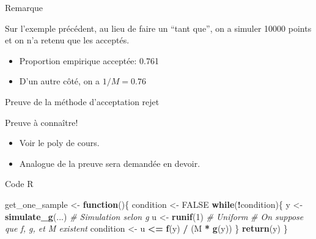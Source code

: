 \documentclass[ignorenonframetext,]{beamer}
\newenvironment{Shaded}{\begin{snugshade}}{\end{snugshade}}
\newcommand{\CommentTok}[1]{\textcolor[rgb]{0.56,0.35,0.01}{\textit{#1}}}
\newcommand{\ControlFlowTok}[1]{\textcolor[rgb]{0.13,0.29,0.53}{\textbf{#1}}}
\newcommand{\DecValTok}[1]{\textcolor[rgb]{0.00,0.00,0.81}{#1}}
\newcommand{\KeywordTok}[1]{\textcolor[rgb]{0.13,0.29,0.53}{\textbf{#1}}}
\newcommand{\NormalTok}[1]{#1}
\newcommand{\OperatorTok}[1]{\textcolor[rgb]{0.81,0.36,0.00}{\textbf{#1}}}
\newcommand{\OtherTok}[1]{\textcolor[rgb]{0.56,0.35,0.01}{#1}}
\newcommand{\StringTok}[1]{\textcolor[rgb]{0.31,0.60,0.02}{#1}}
\providecommand{\tightlist}{%
  \setlength{\itemsep}{0pt}\setlength{\parskip}{0pt}}
\begin{document}
\begin{frame}{Remarque}
\protect\hypertarget{remarque}{}

Sur l'exemple précédent, au lieu de faire un ``tant que'', on a simuler
10000 points et on n'a retenu que les acceptés. \pause

\begin{itemize}
\tightlist
\item
  Proportion empirique acceptée: 0.761
\item
  D'un autre côté, on a \(1/M = 0.76\)
\end{itemize}

\end{frame}

\begin{frame}{Preuve de la méthode d'acceptation rejet}
\protect\hypertarget{preuve-de-la-muxe9thode-dacceptation-rejet}{}

Preuve à connaître!

\begin{itemize}
\tightlist
\item
  Voir le poly de cours.
\item
  Analogue de la preuve sera demandée en devoir.
\end{itemize}

\end{frame}

\begin{frame}[fragile]{Code R}
\protect\hypertarget{code-r}{}

\begin{Shaded}
\begin{Highlighting}[]
\NormalTok{get_one_sample <-}\StringTok{ }\ControlFlowTok{function}\NormalTok{()\{}
\NormalTok{  condition <-}\StringTok{ }\OtherTok{FALSE}
  \ControlFlowTok{while}\NormalTok{(}\OperatorTok{!}\NormalTok{condition)\{}
\NormalTok{    y <-}\StringTok{ }\KeywordTok{simulate_g}\NormalTok{(...) }\CommentTok{# Simulation selon g}
\NormalTok{    u <-}\StringTok{ }\KeywordTok{runif}\NormalTok{(}\DecValTok{1}\NormalTok{) }\CommentTok{# Uniform}
    \CommentTok{# On suppose que f, g, et M existent}
\NormalTok{    condition <-}\StringTok{ }\NormalTok{u }\OperatorTok{<=}\StringTok{ }\KeywordTok{f}\NormalTok{(y) }\OperatorTok{/}\StringTok{ }\NormalTok{(M }\OperatorTok{*}\StringTok{ }\KeywordTok{g}\NormalTok{(y))}
\NormalTok{  \}}
  \KeywordTok{return}\NormalTok{(y)}
\NormalTok{\}}
\end{Highlighting}
\end{Shaded}

\end{frame}
\end{document}
